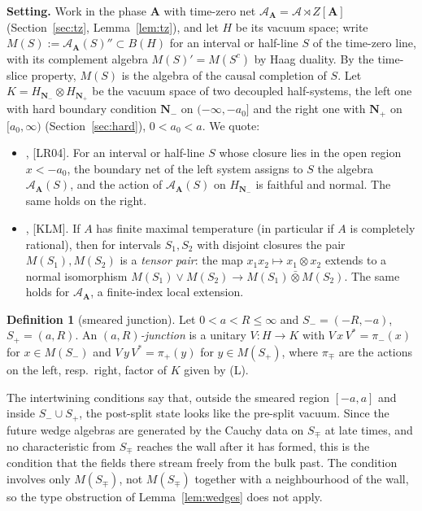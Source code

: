 \documentclass[11pt]{article}
\theoremstyle{definition}
\newtheorem{definition}[theorem]{Definition}
\theoremstyle{remark}
\newcommand{\cA}{\mathcal A}
\newcommand{\bfA}{\mathbf A}
\begin{document}
\textbf{Setting.} Work in the phase $\bfA$ with time-zero net $\cA_{\bfA}=\cA\rtimes Z[\bfA]$ (Section~\ref{sec:tz}, Lemma~\ref{lem:tz}), and let $H$ be its vacuum space; write $M(S):=\cA_{\bfA}(S)''\subset B(H)$ for an interval or half-line $S$ of the time-zero line, with its complement algebra $M(S)'=M(S^c)$ by Haag duality. By the time-slice property, $M(S)$ is the algebra of the causal completion of $S$. Let $K=H_{\mathbf N_-}\otimes H_{\mathbf N_+}$ be the vacuum space of two decoupled half-systems, the left one with hard boundary condition $\mathbf N_-$ on $(-\infty,-a_0]$ and the right one with $\mathbf N_+$ on $[a_0,\infty)$ (Section~\ref{sec:hard}), $0<a_0<a$. We quote:
\begin{itemize}[leftmargin=2.6em]
\item[(L)] [LR09], [LR04]. For an interval or half-line $S$ whose closure lies in the open region $x<-a_0$, the boundary net of the left system assigns to $S$ the algebra $\cA_{\bfA}(S)$, and the action of $\cA_{\bfA}(S)$ on $H_{\mathbf N_-}$ is faithful and normal. The same holds on the right.
\item[(S)] [DLR], [KLM]. If $A$ has finite maximal temperature (in particular if $A$ is completely rational), then for intervals $S_1,S_2$ with disjoint closures the pair $M(S_1),M(S_2)$ is a \emph{tensor pair}: the map $x_1x_2\mapsto x_1\otimes x_2$ extends to a normal isomorphism $M(S_1)\vee M(S_2)\to M(S_1)\bar\otimes M(S_2)$. The same holds for $\cA_{\bfA}$, a finite-index local extension.
\end{itemize}

\begin{definition}[smeared junction]\label{def:smeared}
Let $0<a<R\le\infty$ and $S_-=(-R,-a)$, $S_+=(a,R)$. An \emph{$(a,R)$-junction} is a unitary $V\colon H\to K$ with $V\,x\,V^*=\pi_-(x)$ for $x\in M(S_-)$ and $V\,y\,V^*=\pi_+(y)$ for $y\in M(S_+)$, where $\pi_\mp$ are the actions on the left, resp.\ right, factor of $K$ given by (L).
\end{definition}
The intertwining conditions say that, outside the smeared region $[-a,a]$ and inside $S_-\cup S_+$, the post-split state looks like the pre-split vacuum. Since the future wedge algebras are generated by the Cauchy data on $S_\mp$ at late times, and no characteristic from $S_\mp$ reaches the wall after it has formed, this is the condition that the fields there stream freely from the bulk past. The condition involves only $M(S_\mp)$, not $M(S_\mp)$ together with a neighbourhood of the wall, so the type obstruction of Lemma~\ref{lem:wedges} does not apply.
\end{document}
